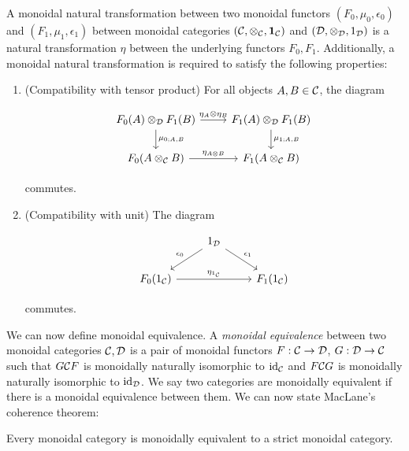 

\begin{defn} A monoidal natural transformation between two monoidal functors $(F_0,\mu_0,\epsilon_0)$ and $(F_1,\mu_1,\epsilon_1)$ between monoidal categories $({\mathcal C},\otimes_{{\mathcal C}},{\mathbf 1}_{{\mathcal C}})$ and $({\mathcal D},\otimes_{{\mathcal D}},1_{{\mathcal D}})$ is a natural transformation $\eta$ between the underlying functors $F_0,F_1$. Additionally, a monoidal natural transformation is required to satisfy the following properties:

\begin{enumerate}
\item (Compatibility with tensor product) For all objects $A,B\in {\mathcal C}$, the diagram

\[\begin{tikzcd}
	{F_0(A)\otimes_{\cD}F_1(B)} & {F_1(A)\otimes_{\cD}F_1(B)} \\
	{F_0(A\otimes_{\cC} B)} & {F_1(A\otimes_{\cC} B)}
	\arrow["{\mu_{0;A,B}}", from=1-1, to=2-1]
	\arrow["{\mu_{1;A,B}}", from=1-2, to=2-2]
	\arrow["{\eta_A\otimes \eta_B}", from=1-1, to=1-2]
	\arrow["{\eta_{A\otimes B}}", from=2-1, to=2-2]
\end{tikzcd}\]

commutes.

\item (Compatibility with unit) The diagram

\[\begin{tikzcd}
	& {1_{\cD}} \\
	{F_0(1_{\cC})} && {F_1(1_{\cC})}
	\arrow["{\eta_{1_{\cC}}}", from=2-1, to=2-3]
	\arrow["{\epsilon_0}"', from=1-2, to=2-1]
	\arrow["{\epsilon_1}", from=1-2, to=2-3]
\end{tikzcd}\]

commutes.
\end{enumerate}
\raggedleft\qedsymbol{}
\end{defn}


We can now define monoidal equivalence. A {\em monoidal equivalence} between two monoidal categories ${\mathcal C},{\mathcal D}$ is a pair of monoidal functors $F:{\mathcal C}\to {\mathcal D}$, $G:{\mathcal D}\to {\mathcal C}$ such that $G{\mathcal C} F$ is monoidally naturally isomorphic to $\operatorname{id}_{{\mathcal C}}$ and $F{\mathcal C} G$ is monoidally naturally isomorphic to $\operatorname{id}_{{\mathcal D}}$. We say two categories are monoidally equivalent if there is a monoidal equivalence between them. We can now state MacLane's coherence theorem:

\begin{thrm} Every monoidal category is monoidally equivalent to a strict monoidal category.
\end{thrm}

